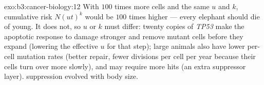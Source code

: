 \begin{solution}{exo:b3:cancer-biology:12}
With $100$ times more cells and the same $u$ and $k$, cumulative risk
$N(ut)^{k}$ would be $100$ times higher --- every elephant should die of
 young. It does not, so $u$ or $k$ must differ: twenty copies of
\emph{TP53} make the apoptotic response to damage stronger and remove
mutant cells before they expand (lowering the effective $u$ for that
step); large animals also have lower per-cell mutation rates (better
repair, fewer divisions per cell per year because their cells turn over
more slowly), and may require more hits (an extra suppressor layer).
 suppression evolved with body size.
\end{solution}

